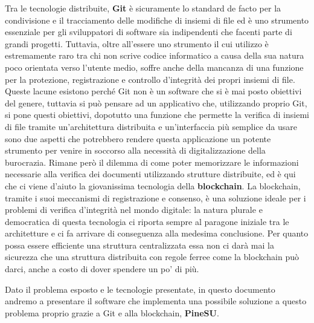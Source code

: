 Tra le tecnologie distribuite, \textbf{Git} è sicuramente lo standard de facto per la condivisione
e il tracciamento delle modifiche di insiemi di file ed è uno strumento essenziale per
gli sviluppatori di software sia indipendenti che facenti parte di grandi progetti.
Tuttavia, oltre all’essere uno strumento il cui utilizzo è estremamente raro tra chi
non scrive codice informatico a causa della sua natura poco orientata verso l’utente medio,
soffre anche della mancanza di una funzione per la protezione, registrazione e controllo
d’integrità dei propri insiemi di file. Queste lacune esistono perché Git non è un software
che si è mai posto obiettivi del genere, tuttavia si può pensare ad un applicativo che,
utilizzando proprio Git, si pone questi obiettivi, dopotutto una funzione che permette
la verifica di insiemi di file tramite un’architettura distribuita e un’interfaccia più
semplice da usare sono due aspetti che potrebbero rendere questa applicazione un potente
strumento per venire in soccorso alla necessità di digitalizzazione della burocrazia.
Rimane però il dilemma di come poter memorizzare le informazioni necessarie alla verifica 
dei documenti utilizzando strutture distribuite, ed è qui che ci viene d’aiuto la giovanissima 
tecnologia della \textbf{blockchain}.
La blockchain, tramite i suoi meccanismi di registrazione e consenso, è una soluzione ideale
per i problemi di verifica d’integrità nel mondo digitale: la natura plurale e democratica
di questa tecnologia ci riporta sempre al paragone iniziale tra le architetture e ci
fa arrivare di conseguenza alla medesima conclusione. Per quanto possa essere efficiente
una struttura centralizzata essa non ci darà mai la sicurezza che una struttura distribuita
con regole ferree come la blockchain può darci, anche a costo di dover spendere un po’ di più.


Dato il problema esposto e le tecnologie presentate, in questo documento andremo a
presentare il software che implementa una possibile soluzione a questo problema
proprio grazie a Git e alla blockchain, \textbf{PineSU}.


